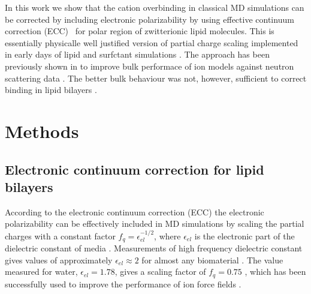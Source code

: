 \documentclass[aip,jcp,twocolumn]{revtex4}
\begin{document}
In this work we show that the cation overbinding in classical MD simulations
can be corrected by including electronic polarizability by using effective continuum
correction (ECC)~\cite{leontyev11} for polar region of zwitterionic lipid molecules.
This is essentially physicalle well justified version of partial charge scaling
implemented in early days of lipid and surfctant simulations \cite{jonsson86,egberts94}. 
The approach has been previously shown in to improve bulk performace of
ion models against neutron scattering data \cite{Jungwirth2015,kohagen14,kohagen16}.
The better bulk behaviour was not, however, sufficient to correct binding in lipid
bilayers \cite{catte16}. 




\section{Methods}

\subsection{Electronic continuum correction for lipid bilayers}
According to the electronic continuum correction (ECC) the electronic
polarizability can be effectively included in MD simulations by scaling
the partial charges with a constant factor $f_q = \epsilon _{el} ^{-1/2}$, 
where $\epsilon _{el}$ is the electronic part of the dielectric constant of 
media \cite{leontyev11}. Measurements of high frequency 
dielectric constant gives values of approximately $\epsilon _{el} \approx 2$ 
for almost any biomaterial \cite{some_original_work, leontyev11}. %
The value measured for water, $\epsilon _{el} = 1.78$, gives 
a scaling factor of $f_q = 0.75$ \cite{some_orig_source, leontyev11}, which has been
successfully used to improve the performance of ion force fields \cite{kohagen14,kohagen16,??}. 
\end{document}

